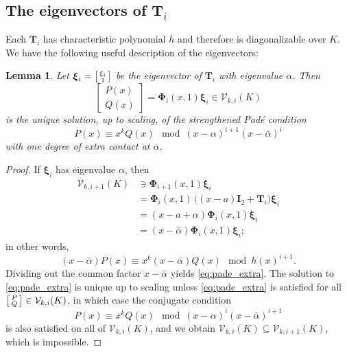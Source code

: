 \documentclass{article}
\numberwithin{equation}{section}
\newtheorem{lem}[thm]{Lemma}
\theoremstyle{definition}
\theoremstyle{remark}
\newcommand{\V}{\mathcal{V}}
\newcommand{\<}{\left\langle}
\renewcommand{\>}{\right\rangle}
\begin{document}
\subsection{The eigenvectors of \texorpdfstring{$\mathbf{T}_i$}{Tᵢ}}\label{sec:eig}

Each $\mathbf{T}_i$ has characteristic polynomial $h$ and therefore is diagonalizable over $K$. We have the following useful description of the eigenvectors:
\begin{lem}\label{lem:extra_contact}
  Let $\boldsymbol{\xi}_i = \begin{bsmallmatrix}
    \xi_i \\ 1
  \end{bsmallmatrix}$ be the eigenvector of $\mathbf{T}_i$ with eigenvalue $\alpha$. Then
  \begin{equation*}
    \begin{bmatrix}
      P(x) \\ Q(x)
    \end{bmatrix} = \boldsymbol{\Phi}_i(x, 1) \boldsymbol{\xi}_i \in \V_{k,i}(K)
  \end{equation*}
  is the unique solution, up to scaling, of the strengthened Pad\'e condition
  \begin{equation} \label{eq:pade_extra}
    P(x) \equiv x^k Q(x) \mod (x - \alpha)^{i+1} (x - \bar\alpha)^i
  \end{equation}
  with one degree of extra contact at $\alpha$.
\end{lem}
\begin{proof}
  If $\boldsymbol{\xi}_i$ has eigenvalue $\alpha$, then
  \begin{equation*}
    \begin{aligned}
      \V_{k,i+1}(K) &\ni \boldsymbol{\Phi}_{i+1}(x, 1) \boldsymbol{\xi}_i \\
      &= \boldsymbol{\Phi}_i(x, 1)\, \big((x - a) \mathbf{I}_2 + \mathbf{T}_i\big) \boldsymbol{\xi}_i \\
      &= (x - a + \alpha) \boldsymbol{\Phi}_i(x, 1) \boldsymbol{\xi}_i \\
      &= (x - \bar\alpha) \boldsymbol{\Phi}_i(x, 1) \boldsymbol{\xi}_i;
    \end{aligned}
  \end{equation*}
  in other words,
  \begin{equation*}
    (x - \bar\alpha) P(x) \equiv x^k (x - \bar\alpha) Q(x) \mod h(x)^{i+1}.
  \end{equation*}
  Dividing out the common factor $x - \bar\alpha$ yields \eqref{eq:pade_extra}. The solution to \eqref{eq:pade_extra} is unique up to scaling unless \eqref{eq:pade_extra} is satisfied for all $\begin{bsmallmatrix}
    P \\ Q
  \end{bsmallmatrix} \in \V_{k,i}(K)$, in which case the conjugate condition
  \begin{equation*}
    P(x) \equiv x^k Q(x) \mod (x-\alpha)^i (x - \bar\alpha)^{i+1}
  \end{equation*}
  is also satisfied on all of $\V_{k,i}(K)$, and we obtain $\V_{k,i}(K) \subseteq \V_{k,i+1}(K)$, which is impossible.
\end{proof}
\end{document}
